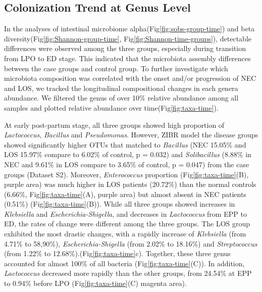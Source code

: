 \documentclass[fleqn,10pt, lineno]{wlpeerj} %
\begin{document}

  \subsection*{Colonization Trend at Genus Level}
  In the analyses of intestinal microbiome alpha(Fig\ref{fig:sobs-group-time}) and beta diversity(Fig\ref{fig:Shannon-group-time}, Fig\ref{fig:Shannon-time-groups}), detectable differences were observed among the three groups, especially during transition from LPO to ED stage.  This indicated that the microbiota assembly differences between the case groups and control group. To further investigate which microbiota composition was correlated with the onset and/or progression of NEC and LOS, we tracked the longitudinal compositional changes in each genera abundance. We filtered the genus of over 10\% relative abundance among all samples and plotted relative abundance over time(Fig\ref{fig:taxa-time}).

    At early post-partum stage, all three groups showed high proportion of \textit{Lactococcus}, \textit{Bacillus} and \textit{Pseudomonas}. However, ZIBR model the disease groups showed significantly higher OTUs that matched to \textit{Bacillus} (NEC 15.05\% and LOS 15.97\% compare to 6.02\% of control, p = 0.032) and \textit{Solibacillus} (8.88\% in NEC and 9.61\% in LOS compare to 3.65\% of control, p = 0.047) from the case groups (Dataset S2). Moreover, \textit{Enterococcus} proportion (Fig\ref{fig:taxa-time}(B), purple area) was much higher in LOS patients (20.72\%) than the normal controls (6.66\%, Fig\ref{fig:taxa-time}(A), purple area) but almost absent in NEC patients (0.51\%) (Fig\ref{fig:taxa-time}(B)).  While all three groups showed increases in \textit{Klebsiella} and \textit{Escherichia-Shigella}, and decreases in \textit{Lactococcus} from EPP to ED, the rates of change were different among the three groups.  The LOS group exhibited the most drastic changes, with a rapidly increase of \textit{Klebsiella} (from 4.71\% to 58,90\%), \textit{Escherichia-Shigella} (from 2.02\% to 18.16\%) and \textit{Streptococcus} (from 1.22\% to 12.68\%).(Fig\ref{fig:taxa-time}c).  Together, these three genus accounted for almost 100\% of all bacteria (Fig\ref{fig:taxa-time}(C)). In addition, \textit{Lactococcus} decreased more rapidly than the other groups, from 24.54\% at EPP to 0.94\% before LPO (Fig\ref{fig:taxa-time}(C) magenta area).
\end{document}

